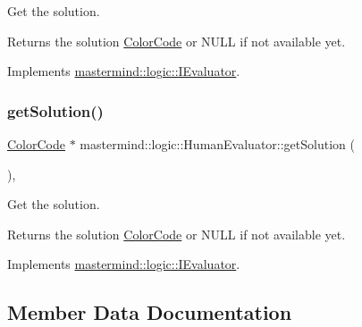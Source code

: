 Get the solution. 

\begin{DoxyReturn}{Returns}
the solution \hyperlink{classmastermind_1_1logic_1_1_color_code}{Color\+Code} or N\+U\+LL if not available yet. 
\end{DoxyReturn}


Implements \hyperlink{classmastermind_1_1logic_1_1_i_evaluator_a1ac9459cbb3698affa4154388b019f09}{mastermind\+::logic\+::\+I\+Evaluator}.

\hypertarget{classmastermind_1_1logic_1_1_human_evaluator_ab369895151e4702e8b57d74c8f6869db}{}\label{classmastermind_1_1logic_1_1_human_evaluator_ab369895151e4702e8b57d74c8f6869db} 
\subsubsection{\texorpdfstring{get\+Solution()}{getSolution()}}
{\footnotesize\ttfamily \hyperlink{classmastermind_1_1logic_1_1_color_code}{Color\+Code} $\ast$ mastermind\+::logic\+::\+Human\+Evaluator\+::get\+Solution (\begin{DoxyParamCaption}{ }\end{DoxyParamCaption})\hspace{0.3cm}{\ttfamily [override]}, {\ttfamily [virtual]}}



Get the solution. 

\begin{DoxyReturn}{Returns}
the solution \hyperlink{classmastermind_1_1logic_1_1_color_code}{Color\+Code} or N\+U\+LL if not available yet. 
\end{DoxyReturn}


Implements \hyperlink{classmastermind_1_1logic_1_1_i_evaluator_a544ecf5ba1d2cb5708e62fc508d341f3}{mastermind\+::logic\+::\+I\+Evaluator}.



\subsection{Member Data Documentation}
\hypertarget{classmastermind_1_1logic_1_1_human_evaluator_afae62228bcb3dafc7b04be93231620d7}{}\label{classmastermind_1_1logic_1_1_human_evaluator_afae62228bcb3dafc7b04be93231620d7} 
